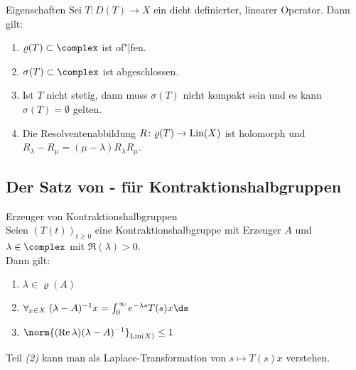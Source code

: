 \begin{Satz}{Eigenschaften}
    Sei $T\colon D(T) \rightarrow X$ ein dicht definierter, linearer Operator.
    Dann gilt:
    \begin{enumerate}
        \item
        $\varrho(T) \subset \complex$ ist of"|fen.

        \item
        $\sigma(T) \subset \complex$ ist abgeschlossen.

        \item
        Ist $T$ nicht stetig, dann muss $\sigma(T)$ nicht kompakt sein und es kann
        $\sigma(T) = \emptyset$ gelten.

        \item
        Die Resolventenabbildung $R\colon \varrho(T) \rightarrow \operatorname{Lin}(X)$
        ist holomorph und $R_\lambda - R_\mu = (\mu - \lambda) R_\lambda R_\mu$.
    \end{enumerate}
\end{Satz}

\subsection{%
    Der Satz von - für Kontraktionshalbgruppen%
}

\begin{Satz}{Erzeuger von Kontraktionshalbgruppen}\\
    Seien $(T(t))_{t \ge 0}$ eine Kontraktionshalbgruppe mit Erzeuger $A$ und
    $\lambda \in \complex$ mit $\Re(\lambda) > 0$.\\
    Dann gilt:
    \begin{enumerate}
        \item
        $\lambda \in \varrho(A)$

        \item
        $\forall_{x \in X}\; (\lambda-A)^{-1} x = \int_0^\infty e^{-\lambda s} T(s) x \ds$

        \item
        $\norm{(\Re \lambda) (\lambda-A)^{-1}}_{\Lin(X)} \le 1$
    \end{enumerate}
\end{Satz}

\begin{Bem}
    Teil \emph{(2)} kann man als Laplace-Transformation von $s \mapsto T(s) x$ verstehen.
\end{Bem}

\linie

